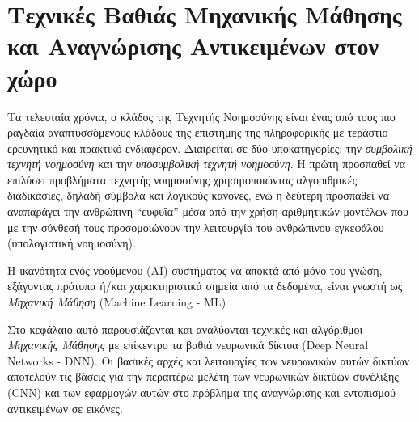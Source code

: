 \chapter{Τεχνικές Βαθιάς Μηχανικής Μάθησης και Αναγνώρισης Αντικειμένων στον χώρο}
\label{chapter:theory}

Τα τελευταία χρόνια, ο κλάδος της Τεχνητής Νοημοσύνης είναι ένας από τους πιο ραγδαία
αναπτυσσόμενους κλάδους της επιστήμης της πληροφορικής με τεράστιο
ερευνητικό και πρακτικό ενδιαφέρον.
Διαιρείται σε δύο υποκατηγορίες: την \emph{συμβολική τεχνητή
νοημοσύνη} και την \emph{υποσυμβολική τεχνητή νοημοσύνη}. Η πρώτη προσπαθεί να
επιλύσει προβλήματα τεχνητής νοημοσύνης χρησιμοποιώντας αλγοριθμικές διαδικασίες, δηλαδή
σύμβολα και λογικούς κανόνες, ενώ η δεύτερη προσπαθεί να αναπαράγει την
ανθρώπινη “ευφυΐα” μέσα από την χρήση αριθμητικών μοντέλων
που με την σύνθεσή τους προσομοιώνουν την λειτουργία του ανθρώπινου εγκεφάλου
(υπολογιστική νοημοσύνη).

Η ικανότητα ενός νοούμενου (AI) συστήματος να αποκτά από μόνο του γνώση,
εξάγοντας πρότυπα ή/και χαρακτηριστικά σημεία από τα δεδομένα,
είναι γνωστή ως \emph{Μηχανική Μάθηση} (Machine Learning - ML) \cite{michalski2013machine}.

Στο κεφάλαιο αυτό παρουσιάζονται και αναλύονται τεχνικές και αλγόριθμοι
\emph{Μηχανικής Μάθησης} με επίκεντρο τα βαθιά νευρωνικά δίκτυα (Deep Neural Networks - DNN).
Οι βασικές αρχές και
λειτουργίες των νευρωνικών αυτών δικτύων αποτελούν τις βάσεις για την περαιτέρω
μελέτη των νευρωνικών δικτύων συνέλιξης (CNN) και των εφαρμογών αυτών στο
πρόβλημα της αναγνώρισης και εντοπισμού αντικειμένων σε εικόνες.






